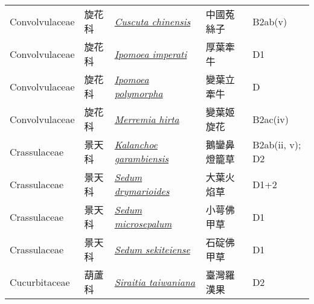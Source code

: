 {\begin{longtable}{L{2.5cm}L{2cm}L{5cm}L{2.5cm}L{3cm}}
    Convolvulaceae & 旋花科 & \href{http://www.theplantlist.org/tpl1.1/search?q=Cuscuta+chinensis}{\textit{Cuscuta chinensis} } & 中國菟絲子 & B2ab(v)    \\
    Convolvulaceae & 旋花科 & \href{http://www.theplantlist.org/tpl1.1/search?q=Ipomoea+imperati}{\textit{Ipomoea imperati} } & 厚葉牽牛 & D1    \\
    Convolvulaceae & 旋花科 & \href{http://www.theplantlist.org/tpl1.1/search?q=Ipomoea+polymorpha}{\textit{Ipomoea polymorpha} } & 變葉立牽牛 & D    \\
    Convolvulaceae & 旋花科 & \href{http://www.theplantlist.org/tpl1.1/search?q=Merremia+hirta}{\textit{Merremia hirta} } & 變葉姬旋花 & B2ac(iv)    \\
    Crassulaceae & 景天科 & \href{http://www.theplantlist.org/tpl1.1/search?q=Kalanchoe+garambiensis}{\textit{Kalanchoe garambiensis} } & 鵝鑾鼻燈籠草 & B2ab(ii, v); D2    \\
    Crassulaceae & 景天科 & \href{http://www.theplantlist.org/tpl1.1/search?q=Sedum+drymarioides}{\textit{Sedum drymarioides} } & 大葉火焰草 & D1+2    \\
    Crassulaceae & 景天科 & \href{http://www.theplantlist.org/tpl1.1/search?q=Sedum+microsepalum}{\textit{Sedum microsepalum} } & 小萼佛甲草 & D1    \\
    Crassulaceae & 景天科 & \href{http://www.theplantlist.org/tpl1.1/search?q=Sedum+sekiteiense}{\textit{Sedum sekiteiense} } & 石碇佛甲草 & D1    \\
    Cucurbitaceae & 葫蘆科 & \href{http://www.theplantlist.org/tpl1.1/search?q=Siraitia+taiwaniana}{\textit{Siraitia taiwaniana} } & 臺灣羅漢果 & D2    \\

\end{longtable}}
